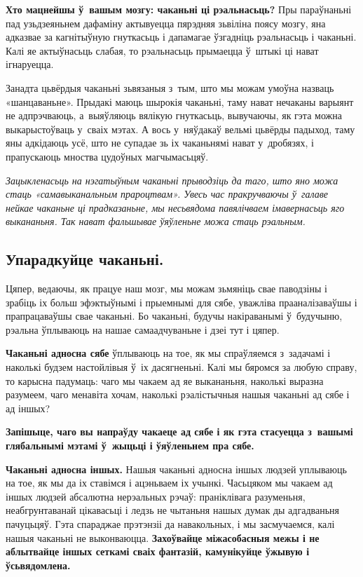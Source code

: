 \textbf{Хто мацнейшы ў~вашым мозгу: чаканьні ці рэальнасьць?} Пры параўнаньні пад узьдзеяньнем дафаміну актывуецца пярэдняя зьвіліна поясу мозгу, яна адказвае за кагнітыўную гнуткасьць і дапамагае ўзгадніць рэальнасьць і чаканьні. Калі яе актыўнасьць слабая, то рэальнасьць прымаецца ў~штыкі ці нават ігнаруецца.


Занадта цьвёрдыя чаканьні зьвязаныя з~тым, што мы можам умоўна назваць «шанцаваньне». Прыдакі маюць шырокія чаканьні, таму нават нечаканы варыянт не адпрэчваюць, а~выяўляюць вялікую гнуткасьць, вывучаючы, як гэта можна выкарыстоўваць у~сваіх мэтах. А вось у~няўдакаў вельмі цьвёрды падыход, таму яны адкідаюць усё, што не супадае зь іх чаканьнямі нават у~дробязях, і прапускаюць мноства цудоўных магчымасьцяў.

\emph{Зацыкленасьць на нэгатыўным чаканьні прыводзіць да таго, што яно можа стаць «самавыканальным прароцтвам». Увесь час пракручваючы ў~галаве нейкае чаканьне ці прадказаньне, мы несьвядома павялічваем імавернасьць яго выкананьня. Так нават фальшывае ўяўленьне можа стаць рэальным.}

\subsection*{Упарадкуйце чаканьні.}

Цяпер, ведаючы, як працуе наш мозг, мы можам зьмяніць свае паводзіны і зрабіць іх больш эфэктыўнымі і прыемнымі для сябе, уважліва прааналізаваўшы і прапрацаваўшы свае чаканьні. Бо чаканьні, будучы накіраванымі ў~будучыню, рэальна ўплываюць на нашае самаадчуваньне і дзеі тут і цяпер.

\textbf{Чаканьні адносна сябе} ўплываюць на тое, як мы спраўляемся з~задачамі і наколькі будзем настойлівыя ў~іх дасягненьні. Калі мы бяромся за любую справу, то карысна падумаць: чаго мы чакаем ад яе выкананьня, наколькі выразна разумеем, чаго менавіта хочам, наколькі рэалістычныя нашыя чаканьні ад сябе і ад іншых?

\textbf{Запішыце, чаго вы напраўду чакаеце ад сябе і як гэта стасуецца з~вашымі глябальнымі мэтамі ў~жыцьці і ўяўленьнем пра сябе.}

\textbf{Чаканьні адносна іншых.} Нашыя чаканьні адносна іншых людзей уплываюць на тое, як мы да іх ставімся і ацэньваем іх учынкі. Часьцяком мы чакаем ад іншых людзей абсалютна нерэальных рэчаў: праніклівага разуменьня, неабгрунтаванай цікавасьці і ледзь не чытаньня нашых думак ды адгадваньня пачуцьцяў. Гэта спараджае прэтэнзіі да навакольных, і мы засмучаемся, калі нашыя чаканьні не выконваюцца. \textbf{Захоўвайце міжасобасныя межы і не аблытвайце іншых сеткамі сваіх фантазій, камунікуйце ўжывую і ўсьвядомлена.}

